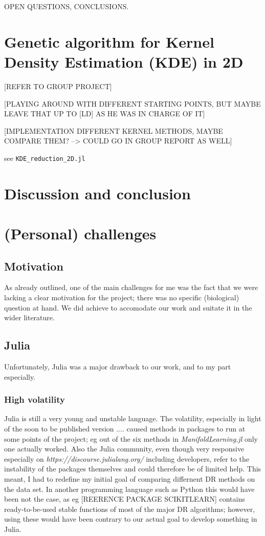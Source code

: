 \documentclass[journal, a4paper]{IEEEtran}
\begin{document}
OPEN QUESTIONS, CONCLUSIONS.


\section{Genetic algorithm for Kernel Density Estimation (KDE) in 2D}

[REFER TO GROUP PROJECT]

[PLAYING AROUND WITH DIFFERENT STARTING POINTS, BUT MAYBE LEAVE THAT UP TO [LD] AS HE WAS IN CHARGE OF IT]

[IMPLEMENTATION DIFFERENT KERNEL METHODS, MAYBE COMPARE THEM? --> COULD GO IN GROUP REPORT AS WELL]

see \texttt{KDE\_reduction\_2D.jl}

\section{Discussion and conclusion}




\section{(Personal) challenges}

\subsection{Motivation}
As already outlined, one of the main challenges for me was the fact that we were lacking a clear motivation for the project; there was no specific (biological) question at hand. We did achieve to accomodate our work and suitate it in the wider literature. 

\subsection{Julia}
Unfortunately, Julia was a major drawback to our work, and to my part especially.

\subsubsection{High volatility}
Julia is still a very young and unstable language. The volatility, especially in light of the soon to be published version ....
caused methods in packages to run at some points of the project; eg out of the six methods in \textit{ManifoldLearning.jl} only one actually worked. 
Also the Julia community, even though very responsive especially on \textit{https://discourse.julialang.org/} including developers, refer to the instability of the packages themselves and could therefore be of limited help. %
This meant, I had to redefine my initial goal of comparing differnent DR methods on the data set.
In another programming language such as Python this would have been not the case, as eg [REERENCE PACKAGE SCIKITLEARN] contains ready-to-be-used stable functions of most of the major DR algorithms; however, using these would have been contrary to our actual goal to develop something in Julia.
\end{document}
